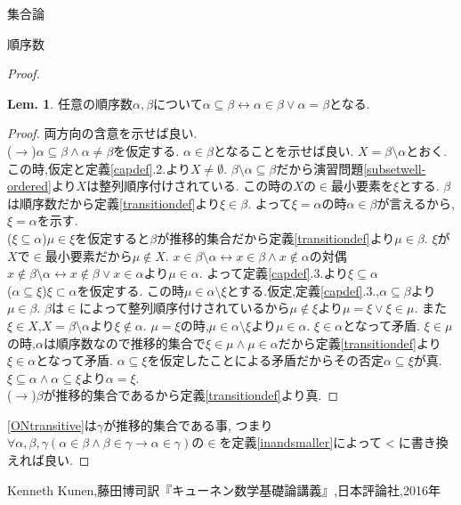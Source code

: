 \documentclass[14pt]{jsarticle}
\theoremstyle{definition}
\newtheorem{lem}[dfn]{Lem.}
\begin{document}
\begin{section}{集合論}
\begin{subsection}{順序数}
\begin{proof}
\begin{lem}
任意の順序数$\alpha,\beta$について$\alpha\subseteq\beta\leftrightarrow\alpha\in\beta\lor\alpha=\beta$となる.
\end{lem}
\begin{proof}両方向の含意を示せば良い.\\
($\to$)$\alpha\subseteq\beta\land \alpha\not=\beta$を仮定する.
$\alpha\in\beta$となることを示せば良い.
$X=\beta\setminus\alpha$とおく.
この時,仮定と定義\ref{capdef}.2.より$X\not=\emptyset$.
$\beta\setminus\alpha\subseteq\beta$だから演習問題\ref{subsetwell-ordered}より$X$は整列順序付けされている.
この時の$X$の$\in$最小要素を$\xi$とする.
$\beta$は順序数だから定義\ref{transitiondef}より$\xi\in\beta$.
よって$\xi=\alpha$の時$\alpha\in\beta$が言えるから,$\xi=\alpha$を示す.\\
($\xi\subseteq\alpha$)$\mu\in\xi$を仮定すると$\beta$が推移的集合だから定義\ref{transitiondef}より$\mu\in\beta$.
$\xi$が$X$で$\in$最小要素だから$\mu\not\in X$.
$x\in\beta\setminus\alpha\leftrightarrow x\in\beta\land x\not\in\alpha$の対偶$x\not\in\beta\setminus\alpha\leftrightarrow x\not\in\beta\lor x\in\alpha$より$\mu\in\alpha$.
よって定義\ref{capdef}.3.より$\xi\subseteq\alpha$\\
($\alpha\subseteq\xi$)$\xi\subset\alpha$を仮定する.
この時$\mu\in\alpha\setminus\xi$とする.仮定,定義\ref{capdef}.3.,$\alpha\subseteq\beta$より$\mu\in\beta$.
$\beta$は$\in$によって整列順序付けされているから$\mu\not\in\xi$より$\mu=\xi\lor\xi\in\mu$.
また$\xi\in X$,$X=\beta\setminus\alpha$より$\xi\not\in\alpha$.
$\mu=\xi$の時,$\mu\in\alpha\setminus\xi$より$\mu\in\alpha$.
$\xi\in\alpha$となって矛盾.
$\xi\in\mu$の時,$\alpha$は順序数なので推移的集合で$\xi\in\mu\land\mu\in\alpha$だから定義\ref{transitiondef}より$\xi\in\alpha$となって矛盾.
$\alpha\subseteq\xi$を仮定したことによる矛盾だからその否定$\alpha\subseteq\xi$が真.
$\xi\subseteq\alpha\land\alpha\subseteq\xi$より$\alpha=\xi$.\\
($\rightarrow$)$\beta$が推移的集合であるから定義\ref{transitiondef}より真.
\end{proof}

\ref{ONtransitive}は$\gamma$が推移的集合である事,
つまり$\forall \alpha,\beta,\gamma(\alpha\in\beta\land\beta\in\gamma\to\alpha\in\gamma)$の$\in$を定義\ref{inandsmaller}によって$<$に書き換えれば良い.

\end{proof}
\end{subsection}
\end{section}

\begin{thebibliography}{9}
 Kenneth Kunen,藤田博司訳『キューネン数学基礎論講義』,日本評論社,2016年
\end{thebibliography}
\end{document}
